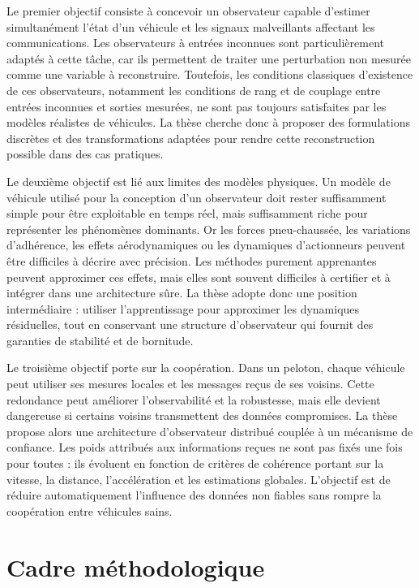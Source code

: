 Le premier objectif consiste à concevoir un observateur capable d'estimer simultanément l'état d'un véhicule et les signaux malveillants affectant les communications. Les observateurs à entrées inconnues sont particulièrement adaptés à cette tâche, car ils permettent de traiter une perturbation non mesurée comme une variable à reconstruire. Toutefois, les conditions classiques d'existence de ces observateurs, notamment les conditions de rang et de couplage entre entrées inconnues et sorties mesurées, ne sont pas toujours satisfaites par les modèles réalistes de véhicules. La thèse cherche donc à proposer des formulations discrètes et des transformations adaptées pour rendre cette reconstruction possible dans des cas pratiques.

Le deuxième objectif est lié aux limites des modèles physiques. Un modèle de véhicule utilisé pour la conception d'un observateur doit rester suffisamment simple pour être exploitable en temps réel, mais suffisamment riche pour représenter les phénomènes dominants. Or les forces pneu-chaussée, les variations d'adhérence, les effets aérodynamiques ou les dynamiques d'actionneurs peuvent être difficiles à décrire avec précision. Les méthodes purement apprenantes peuvent approximer ces effets, mais elles sont souvent difficiles à certifier et à intégrer dans une architecture sûre. La thèse adopte donc une position intermédiaire : utiliser l'apprentissage pour approximer les dynamiques résiduelles, tout en conservant une structure d'observateur qui fournit des garanties de stabilité et de bornitude.

Le troisième objectif porte sur la coopération. Dans un peloton, chaque véhicule peut utiliser ses mesures locales et les messages reçus de ses voisins. Cette redondance peut améliorer l'observabilité et la robustesse, mais elle devient dangereuse si certains voisins transmettent des données compromises. La thèse propose alors une architecture d'observateur distribué couplée à un mécanisme de confiance. Les poids attribués aux informations reçues ne sont pas fixés une fois pour toutes : ils évoluent en fonction de critères de cohérence portant sur la vitesse, la distance, l'accélération et les estimations globales. L'objectif est de réduire automatiquement l'influence des données non fiables sans rompre la coopération entre véhicules sains.

\section*{Cadre méthodologique}

